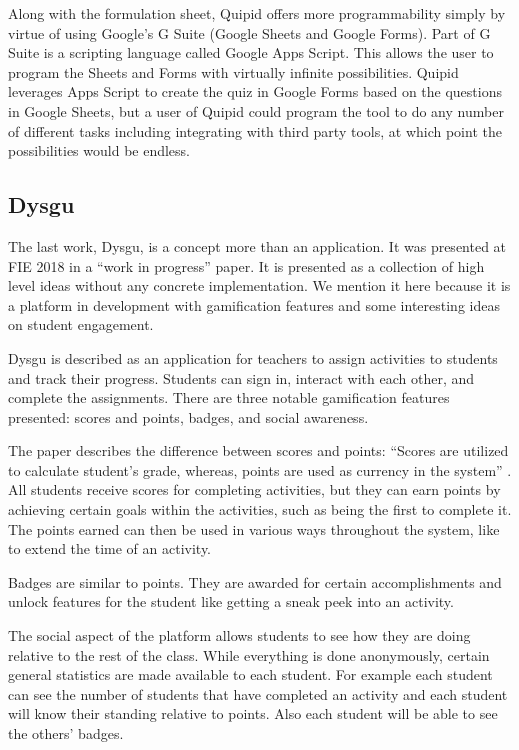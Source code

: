\documentclass{article}
\begin{document}
        Along with the formulation sheet, Quipid offers more programmability simply by virtue of using Google's G Suite (Google Sheets and Google Forms). Part of G Suite is a scripting language called Google Apps Script. This allows the user to program the Sheets and Forms with virtually infinite possibilities. Quipid leverages Apps Script to create the quiz in Google Forms based on the questions in Google Sheets, but a user of Quipid could program the tool to do any number of different tasks including integrating with third party tools, at which point the possibilities would be endless.  
        
    \subsection{Dysgu}
        The last work, Dysgu, is a concept more than an application. It was presented at FIE 2018 in a ``work in progress'' paper. It is presented as a collection of high level ideas without any concrete implementation. We mention it here because it is a platform in development with gamification features and some interesting ideas on student engagement.
        \smallskip
        
        Dysgu is described as an application for teachers to assign activities to students and track their progress. Students can sign in, interact with each other, and complete the assignments. There are three notable gamification features presented: scores and points, badges, and social awareness.
        \smallskip
        
        The paper describes the difference between scores and points: ``Scores are utilized to calculate student’s grade, whereas, points are used as currency in the system'' \cite{dysgu}. All students receive scores for completing activities, but they can earn points by achieving certain goals within the activities, such as being the first to complete it. The points earned can then be used in various ways throughout the system, like to extend the time of an activity. 
        \smallskip
        
        Badges are similar to points. They are awarded for certain accomplishments and unlock features for the student like getting a sneak peek into an activity.   
        \smallskip
        
        The social aspect of the platform allows students to see how they are doing relative to the rest of the class. While everything is done anonymously, certain general statistics are made available to each student. For example each student can see the number of students that have completed an activity and each student will know their standing relative to points. Also each student will be able to see the others' badges. 
\end{document}

